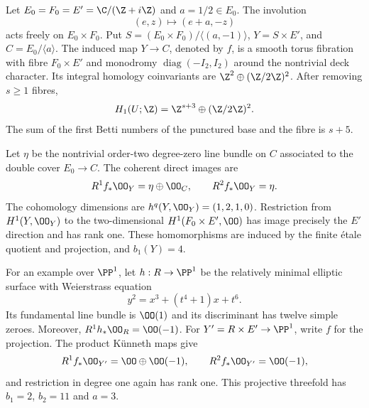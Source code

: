 \begin{proposition}\hypertarget{tag-01G3}{}\label{cdp:st:D.1.5}
Let $E_0=F_0=E'=\C/(\Z+i\Z)$ and $a=1/2\in E_0$.
The involution
\[
(e,z)\longmapsto(e+a,-z)
\]
acts freely on $E_0\times F_0$. Put
$S=(E_0\times F_0)/\langle(a,-1)\rangle$,
$Y=S\times E'$, and $C=E_0/\langle a\rangle$.
The induced map $Y\to C$, denoted by $f$, is a smooth torus fibration with fibre
$F_0\times E'$ and monodromy
$\operatorname{diag}(-I_2,I_2)$ around the nontrivial deck character.
Its integral homology coinvariants are
$\Z^2\oplus(\Z/2\Z)^2$. After removing $s\geq1$ fibres,
\[
H_1(U;\Z)=\Z^{s+3}\oplus(\Z/2\Z)^2.
\]
The sum of the first Betti numbers of the punctured base and the
fibre is $s+5$.

Let $\eta$ be the nontrivial order-two degree-zero line bundle on
$C$ associated to the double cover $E_0\to C$. The coherent direct
images are
\[
R^1f_*\OO_Y=\eta\oplus\OO_C,\qquad R^2f_*\OO_Y=\eta.
\]
The cohomology dimensions are $h^q(Y,\OO_Y)=(1,2,1,0)$.
Restriction from $H^1(Y,\OO_Y)$ to the two-dimensional
$H^1(F_0\times E',\OO)$ has image precisely the $E'$ direction
and has rank one. These homomorphisms are induced by the finite
\'etale quotient and projection, and $b_1(Y)=4$.

For an example over $\PP^1$, let
$h:R\to\PP^1$ be the relatively minimal elliptic surface with
Weierstrass equation
\[
y^2=x^3+(t^4+1)x+t^6.
\]
Its fundamental line bundle is $\OO(1)$ and its discriminant has
twelve simple zeroes. Moreover, $R^1h_*\OO_R=\OO(-1)$.
For $Y'=R\times E'\to\PP^1$, write $f$ for the projection.
The product K\"unneth maps give
\[
R^1f_*\OO_{Y'}=\OO\oplus\OO(-1),\qquad
R^2f_*\OO_{Y'}=\OO(-1),
\]
and restriction in degree one again has rank one. This projective
threefold has $b_1=2$, $b_2=11$ and $a=3$.
\end{proposition}
